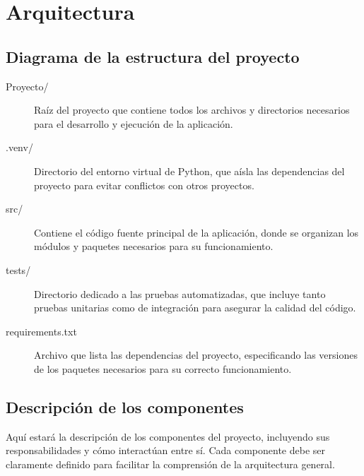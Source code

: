 	\section{Arquitectura}
	\subsection{Diagrama de la estructura del proyecto}

	\begin{description}
		\item[Proyecto/]  
		Raíz del proyecto que contiene todos los archivos y directorios necesarios para el desarrollo y ejecución de la aplicación.
		\item[.venv/]  
		Directorio del entorno virtual de Python, que aísla las dependencias del proyecto para evitar conflictos con otros proyectos.
		\item[src/]  
		Contiene el código fuente principal de la aplicación, donde se organizan los módulos y paquetes necesarios para su funcionamiento.
		\item[tests/]  
		Directorio dedicado a las pruebas automatizadas, que incluye tanto pruebas unitarias como de integración para asegurar la calidad del código.
		\item[requirements.txt]  
		Archivo que lista las dependencias del proyecto, especificando las versiones de los paquetes necesarios para su correcto funcionamiento.
	\end{description}

	\subsection{Descripci\'on de los componentes}

	\noindent Aquí estará la descripción de los componentes del proyecto, incluyendo sus responsabilidades y cómo interactúan entre sí. Cada componente debe ser claramente definido para facilitar la comprensión de la arquitectura general.


